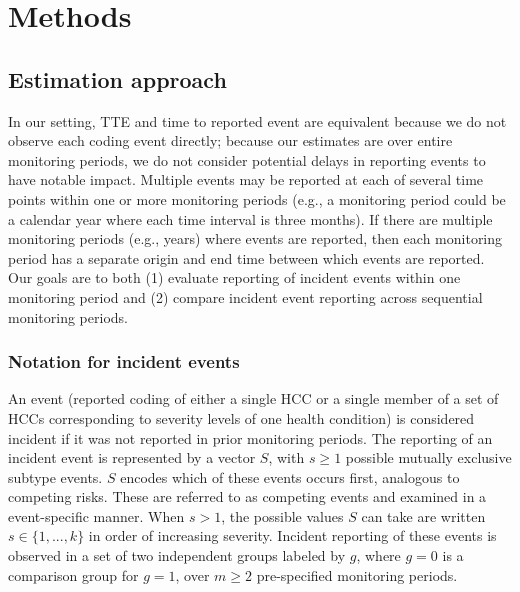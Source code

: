 \documentclass[
  12pt,
  number]{elsarticle}
\begin{document}
\section{Methods}\label{methods}

\subsection{Estimation approach}\label{estimation-approach}

In our setting, TTE and time to reported event are equivalent because we
do not observe each coding event directly; because our estimates are
over entire monitoring periods, we do not consider potential delays in
reporting events to have notable impact. Multiple events may be reported
at each of several time points within one or more monitoring periods
(e.g., a monitoring period could be a calendar year where each time
interval is three months). If there are multiple monitoring periods
(e.g., years) where events are reported, then each monitoring period has
a separate origin and end time between which events are reported. Our
goals are to both (1) evaluate reporting of incident events within one
monitoring period and (2) compare incident event reporting across
sequential monitoring periods.

\subsubsection{Notation for incident
events}\label{notation-for-incident-events}

An event (reported coding of either a single HCC or a single member of a
set of HCCs corresponding to severity levels of one health condition) is
considered incident if it was not reported in prior monitoring periods.
The reporting of an incident event is represented by a vector \(S\),
with \(s \ge 1\) possible mutually exclusive subtype events. \(S\)
encodes which of these events occurs first, analogous to competing
risks. These are referred to as competing events and examined in a
event-specific manner. When \(s > 1\), the possible values \(S\) can
take are written \(s \in \{1, ..., k\}\) in order of increasing
severity. Incident reporting of these events is observed in a set of two
independent groups labeled by \(g\), where \(g=0\) is a comparison group
for \(g=1\), over \(m \ge 2\) pre-specified monitoring periods.
\end{document}
